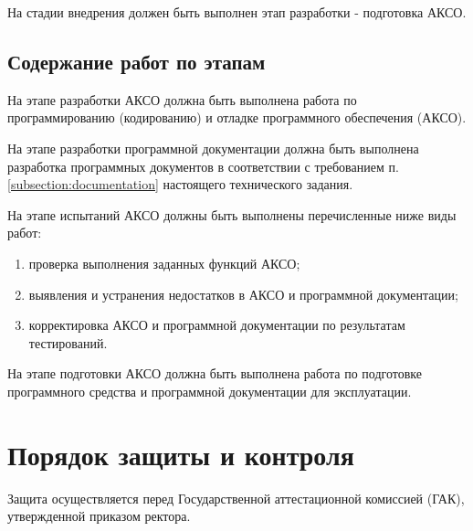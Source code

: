 \documentclass[a4paper,14pt]{extreport}
\begin{document}
	На стадии внедрения должен быть выполнен этап разработки - подготовка АКСО.
	
	\subsection{Содержание работ по этапам}
	
	На этапе разработки АКСО должна быть выполнена работа по программированию (кодированию) и отладке программного обеспечения (АКСО).
	
	На этапе разработки программной документации должна быть выполнена разработка программных документов в соответствии с требованием п. \ref{subsection:documentation} настоящего технического задания.
	
	На этапе испытаний АКСО должны быть выполнены перечисленные ниже виды работ:
	
	\begin{enumerate}
		\item проверка выполнения заданных функций АКСО;
		\item выявления и устранения недостатков в АКСО и программной документации; 
		\item корректировка АКСО и программной документации по результатам тестирований\cite{gost-28195-89}.
	\end{enumerate}
	
	На этапе подготовки АКСО должна быть выполнена работа по подготовке программного средства и программной документации для эксплуатации.
	
	\section{Порядок защиты и контроля}
	
	Защита осуществляется перед Государственной аттестационной комиссией (ГАК), утвержденной приказом ректора.
	
\end{document}
